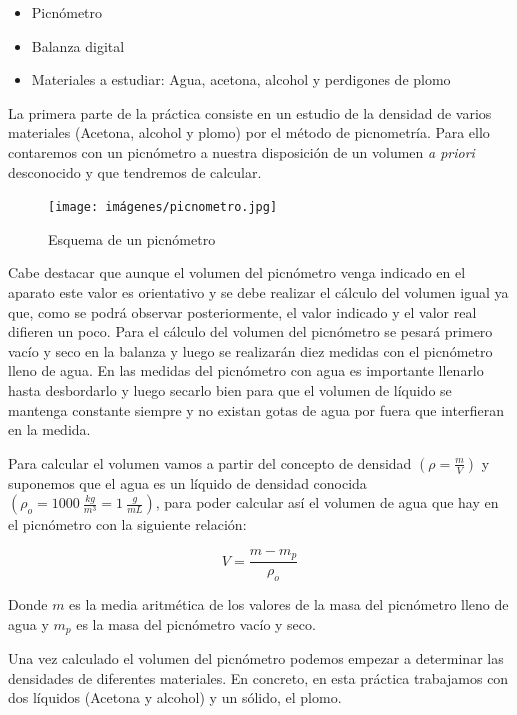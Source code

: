 \documentclass[a4paper,12pt,titlepage]{report}
\begin{document}
\begin{itemize}
    \item Picnómetro
    \item Balanza digital
    \item Materiales a estudiar: Agua, acetona, alcohol y perdigones de plomo
\end{itemize}

La primera parte de la práctica consiste en un estudio de la densidad de varios materiales (Acetona, alcohol y plomo) por el método de picnometría. Para ello contaremos con un picnómetro a nuestra disposición de un volumen \textit{a priori} desconocido y que tendremos de calcular. 

\newpage

\begin{figure}[h!]
    \centering
    \texttt{[image: imágenes/picnometro.jpg]}

    \caption{Esquema de un picnómetro}
\end{figure}

Cabe destacar que aunque el volumen del picnómetro venga indicado en el aparato este valor es orientativo y se debe realizar el cálculo del volumen igual ya que, como se podrá observar posteriormente, el valor indicado y el valor real difieren un poco. Para el cálculo del volumen del picnómetro se pesará primero vacío y seco en la balanza y luego se realizarán diez medidas con el picnómetro lleno de agua. En las medidas del picnómetro con agua es importante llenarlo hasta desbordarlo y luego secarlo bien para que el volumen de líquido se mantenga constante siempre y no existan gotas de agua por fuera que interfieran en la medida.

\par Para calcular el volumen vamos a partir del concepto de densidad $(\rho = \frac{m}{V})$ y suponemos que el agua es un líquido de densidad conocida $(\rho_{o} = 1000 \: \frac{kg}{m^3}=1 \: \frac{g}{mL})$, para poder calcular así el volumen de agua que hay en el picnómetro con la siguiente relación:

\begin{equation}
    V = \frac{m-m_{p}}{\rho_{o}}
    \label{VolPicnometro}
\end{equation}

Donde $m$ es la media aritmética de los valores de la masa del picnómetro lleno de agua y $m_{p}$ es la masa del picnómetro vacío y seco.

\par Una vez calculado el volumen del picnómetro podemos empezar a determinar las densidades de diferentes materiales. En concreto, en esta práctica trabajamos con dos líquidos (Acetona y alcohol) y un sólido, el plomo.
\end{document}
